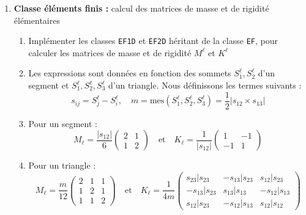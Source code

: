 \documentclass{article}
\begin{document}
\begin{enumerate}[label=\arabic*]
        \item \textbf{Classe éléments finis :} calcul des matrices de masse et de rigidité élémentaires
        \begin{enumerate}[label=\alph*.]
            \item Implémenter les classes \texttt{EF1D} et \texttt{EF2D} héritant de la classe \texttt{EF}, pour calculer les matrices de masse et de rigidité \(M^\ell\) et \(K^\ell\)
            \item Les expressions sont données en fonction des sommets \(S^{\ell}_1, S^{\ell}_2\) d'un segment et \(S^{\ell}_1, S^{\ell}_2, S^{\ell}_3\) d'un triangle. Nous définissons les termes suivants :
                \[
                s_{ij} = S^{\ell}_j - S^{\ell}_i, \quad m = \text{mes}(S^{\ell}_1,S^{\ell}_2, S^{\ell}_3) = \frac{1}{2} |s_{12} \times s_{13}|
                \]
            \item Pour un segment :
                \[
                M_{\ell} = \frac{|s_{12}|}{6} \begin{pmatrix} 2 & 1 \\ 1 & 2 \end{pmatrix} 
                \quad \text{et} \quad
                K_{\ell} = \frac{1}{|s_{12}|} \begin{pmatrix} 1 & -1 \\ -1 & 1 \end{pmatrix}
                \]
            \item Pour un triangle :
                \[
                M_{\ell} = \frac{m}{12} \begin{pmatrix} 2 & 1 & 1 \\ 1 & 2 & 1 \\ 1 & 1 & 2 \end{pmatrix}
                \quad \text{et} \quad
                K_{\ell} = \frac{1}{4m} \begin{pmatrix} s_{23}|s_{23} & -s_{13}|s_{23} & s_{12}|s_{23} \\ -s_{13}|s_{23} & s_{13}|s_{13} & -s_{12}|s_{13} \\ s_{12}|s_{23} & -s_{12}|s_{13} & s_{12}|s_{12} \end{pmatrix}
                \]
        \end{enumerate}


\end{enumerate}
\end{document}
